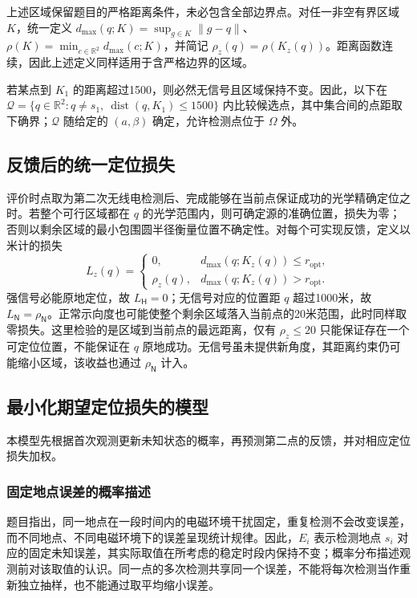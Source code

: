 上述区域保留题目的严格距离条件，未必包含全部边界点。对任一非空有界区域 \(K\)，统一定义 \(d_{\max}(q;K)=\sup_{g\in K}\|g-q\|\)、\(\rho(K)=\min_{c\in\mathbb R^2}d_{\max}(c;K)\)，并简记 \(\rho_z(q)=\rho(K_z(q))\)。距离函数连续，因此上述定义同样适用于含严格边界的区域。

若某点到 \(K_1\) 的距离超过1500，则必然无信号且区域保持不变。因此，以下在 \(\mathcal Q=\{q\in\mathbb R^2:q\ne s_1,\ \operatorname{dist}(q,K_1)\le1500\}\) 内比较候选点，其中集合间的点距取下确界；\(\mathcal Q\) 随给定的 \((a,\beta)\) 确定，允许检测点位于 \(\Omega\) 外。

\subsection{反馈后的统一定位损失}

评价时点取为第二次无线电检测后、完成能够在当前点保证成功的光学精确定位之时。若整个可行区域都在 \(q\) 的光学范围内，则可确定源的准确位置，损失为零；否则以剩余区域的最小包围圆半径衡量位置不确定性。对每个可实现反馈，定义以米计的损失
\begin{equation}
 L_z(q)=
 \begin{cases}
 0,&d_{\max}(q;K_z(q))\le r_{\mathrm{opt}},\\
 \rho_z(q),&d_{\max}(q;K_z(q))>r_{\mathrm{opt}}.
 \end{cases}
\label{eq:q2-pair-loss}
\end{equation}
强信号必能原地定位，故 \(L_{\mathsf H}=0\)；无信号对应的位置距 \(q\) 超过1000米，故 \(L_{\mathsf N}=\rho_{\mathsf N}\)。正常示向度也可能使整个剩余区域落入当前点的20米范围，此时同样取零损失。这里检验的是区域到当前点的最远距离，仅有 \(\rho_z\le20\) 只能保证存在一个可定位位置，不能保证在 \(q\) 原地成功。无信号虽未提供新角度，其距离约束仍可能缩小区域，该收益也通过 \(\rho_{\mathsf N}\) 计入。

\subsection{最小化期望定位损失的模型}

本模型先根据首次观测更新未知状态的概率，再预测第二点的反馈，并对相应定位损失加权。

\subsubsection{固定地点误差的概率描述}

题目指出，同一地点在一段时间内的电磁环境干扰固定，重复检测不会改变误差，而不同地点、不同电磁环境下的误差呈现统计规律。因此，\(E_i\) 表示检测地点 \(s_i\) 对应的固定未知误差，其实际取值在所考虑的稳定时段内保持不变；概率分布描述观测前对该取值的认识。同一点的多次检测共享同一个误差，不能将每次检测当作重新独立抽样，也不能通过取平均缩小误差。

